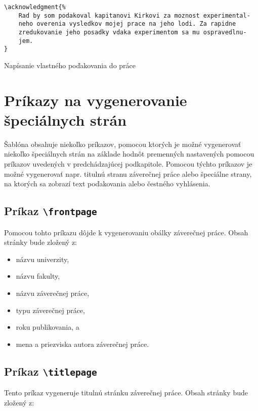 \begin{listing}[ht!]
\begin{verbatim}
\acknowledgment{%
    Rad by som podakoval kapitanovi Kirkovi za moznost experimental-
    neho overenia vysledkov mojej prace na jeho lodi. Za rapidne 
    zredukovanie jeho posadky vdaka experimentom sa mu ospravedlnu-
    jem.
}
\end{verbatim}
\caption{Napísanie vlastného poďakovania do práce}
\end{listing}



\section{Príkazy na vygenerovanie špeciálnych strán}

Šablóna obsahuje niekoľko príkazov, pomocou ktorých je možné vygenerovať niekoľko špeciálnych strán na základe hodnôt premenných nastavených pomocou príkazov uvedených v predchádzajúcej podkapitole. Pomocou týchto príkazov je možné vygenerovať napr. titulnú stranu záverečnej práce alebo špeciálne strany, na ktorých sa zobrazí text poďakovania alebo čestného vyhlásenia.

\subsection{Príkaz {\tt \textbackslash{}frontpage}}

Pomocou tohto príkazu dôjde k vygenerovaniu obálky záverečnej práce. Obsah stránky bude zložený z:

\begin{itemize}
    \item názvu univerzity,
    \item názvu fakulty,
    \item názvu záverečnej práce,
    \item typu záverečnej práce,
    \item roku publikovania, a
    \item mena a priezviska autora záverečnej práce.
\end{itemize}


\subsection{Príkaz {\tt \textbackslash{}titlepage}}

Tento príkaz vygeneruje titulnú stránku záverečnej práce. Obsah stránky bude zložený z:

